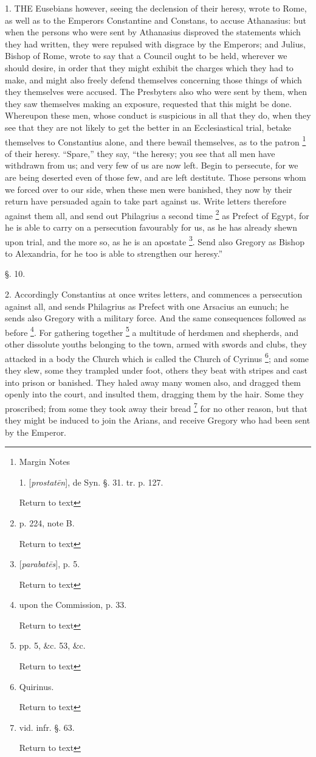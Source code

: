 1. THE
Eusebians however, seeing the declension of their heresy, wrote to
Rome, as well as to the Emperors Constantine and Constans, to accuse
Athanasius: but when the persons who were sent by Athanasius disproved
the statements which they had written, they were repulsed with
disgrace by the Emperors; and Julius, Bishop of Rome, wrote to say
that a Council ought to be held, wherever we should desire, in order
that they might exhibit the charges which they had to make, and might
also freely defend themselves concerning those things of which they
themselves were accused. The Presbyters also who were sent by them,
when they saw themselves making an exposure, requested that this might
be done. Whereupon these men, whose conduct is suspicious in all that
they do, when they see that they are not likely to get the better in
an Ecclesiastical trial, betake themselves to Constantius alone, and
there bewail themselves, as to the patron \footnote{Margin Notes

1. [\emph{prostat\={e}n}],
de Syn. §. 31. tr. p. 127.

Return to text} of their heresy. ``Spare,'' they say, ``the heresy; you see that
all men have withdrawn from us; and very few of us are now left. Begin
to persecute, for we are being deserted even of those few, and are
left destitute. Those persons whom we forced over to our side, when
these men were banished, they now by their return have persuaded again
to take part against us. Write letters therefore against them all, and
send out Philagrius a second time \footnote{p. 224, note B.

Return to text} as Prefect of Egypt, for he is able to carry on a persecution
favourably for us, as he has already shewn upon trial, and the more
so, as he is an apostate \footnote{[\emph{parabat\={e}s}], p. 5.

Return to text}.
Send also Gregory as Bishop to Alexandria, for he too is able to
strengthen our heresy.''

§. 10.

2. Accordingly Constantius at once writes
letters, and commences a persecution against all, and sends Philagrius
as Prefect with one Arsacius an eunuch; he sends also Gregory with a
military force. And the same consequences followed as before \footnote{upon the Commission, p. 33.

Return to text}. For gathering together \footnote{pp. 5, \&c. 53, \&c.

Return to text} a multitude of herdsmen and shepherds, and other dissolute
youths belonging to the town, armed with swords and clubs, they
attacked in a body the Church which is called the Church of Cyrinus \footnote{Quirinus.

Return to text}; and some they slew, some they trampled under foot, others they
beat with stripes and cast into prison or banished. They haled away
many women also, and dragged them openly into the court, and insulted
them, dragging them by the hair. Some they proscribed; from some they
took away their bread \footnote{vid. infr. §. 63.

Return to text}
for no other reason, but that they might be induced to join the
Arians, and receive Gregory who had been sent by the Emperor.


